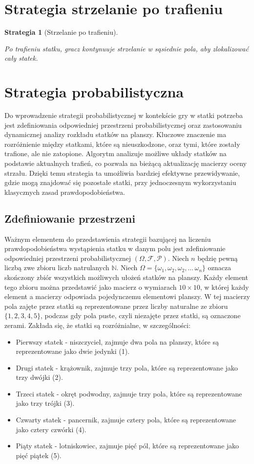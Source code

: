 \documentclass[magisterska]{pracadypl}
\newtheorem{strategy}{Strategia}[section]
\begin{document}
\section{Strategia strzelanie po trafieniu}
\begin{strategy}[Strzelanie po trafieniu]\cite{yt_1}

Po trafieniu statku, gracz kontynuuje strzelanie w sąsiednie pola, aby zlokalizować cały statek.
\end{strategy}
\section{Strategia probabilistyczna}
Do wprowadzenie strategii probabilistycznej w kontekście gry w statki  potrzeba jest zdefiniowania odpowiedniej przestrzeni probabilistycznej oraz zastosowaniu dynamicznej analizy rozkładu statków na planszy. Kluczowe znaczenie ma rozróżnienie między statkami, które są nieuszkodzone, oraz tymi, które zostały trafione, ale nie zatopione. Algorytm analizuje możliwe układy statków na podstawie aktualnych trafień, co pozwala na bieżącą aktualizację macierzy oceny strzału. Dzięki temu strategia ta umożliwia bardziej efektywne przewidywanie, gdzie mogą znajdować się pozostałe statki, przy jednoczesnym wykorzystaniu klasycznych zasad prawdopodobieństwa.
\subsection{Zdefiniowanie przestrzeni}
Ważnym elementem do przedstawienia strategii bazującej na liczeniu prawdopodobieństwa wystąpienia statku w danym polu jest zdefiniowanie odpowiedniej przestrzeni probabilistycznej \((\Omega,\mathcal{F}, \mathcal{P})\). 
Niech $n$ będzię pewną liczbą zwe zbioru liczb natrulanych $\mathbb{N}$. Niech $\Omega=\{\omega_{1},\omega_{2},\omega_{2},\ldots\,\omega_{n}\}$ oznacza skończony zbiór wszystkich możliwych ułożeń statków na planszy. Każdy element tego zbioru można przedstawić jako macierz o wymiarach \(10 \times 10\), w której każdy element a macierzy odpowiada pojedynczemu elementowi planszy. W tej  macierzy pola zajęte przez statki są reprezentowane przez liczby naturalne ze zbioru $\{1,2,3,4,5\}$, podczas gdy pola puste, czyli niezajęte przez statki, są oznaczone zerami. Zakłada się, że statki są rozróżnialne, w szczególności:
\begin{itemize} 
\item Pierwszy statek - niszczyciel, zajmuje dwa pola na planszy, które są reprezentowane jako dwie jedynki (1).
\item Drugi statek - krążownik, zajmuje trzy pola, które są reprezentowane jako trzy dwójki (2).
\item Trzeci statek - okręt podwodny, zajmuje trzy pola, które są reprezentowane jako trzy trójki (3).
\item Czwarty statek - pancernik, zajmuje cztery pola, które są reprezentowane jako cztery czwórki (4).
\item Piąty statek - lotniskowiec, zajmuje pięć pól, które są reprezentowane jako pięć piątek (5). 
\end{itemize}
\end{document}
